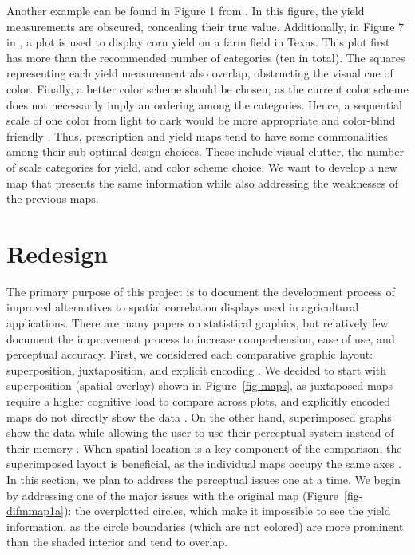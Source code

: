 \documentclass[
  authoryear,
  preprint,
  3p]{elsarticle}
\begin{document}
Another example can be found in Figure 1 from \citet{map_2020}. In this
figure, the yield measurements are obscured, concealing their true
value. Additionally, in Figure 7 in \citet{searcy1997precision}, a plot
is used to display corn yield on a farm field in Texas. This plot first
has more than the recommended number of categories (ten in total). The
squares representing each yield measurement also overlap, obstructing
the visual cue of color. Finally, a better color scheme should be
chosen, as the current color scheme does not necessarily imply an
ordering among the categories. Hence, a sequential scale of one color
from light to dark would be more appropriate and color-blind friendly
\citep{MIDWAY2020100141}. Thus, prescription and yield maps tend to have
some commonalities among their sub-optimal design choices. These include
visual clutter, the number of scale categories for yield, and color
scheme choice. We want to develop a new map that presents the same
information while also addressing the weaknesses of the previous maps.

\hypertarget{redesign}{%
\section{Redesign}\label{redesign}}

The primary purpose of this project is to document the development
process of improved alternatives to spatial correlation displays used in
agricultural applications. There are many papers on statistical
graphics, but relatively few document the improvement process to
increase comprehension, ease of use, and perceptual accuracy. First, we
considered each comparative graphic layout: superposition,
juxtaposition, and explicit encoding \citep{gleicher2011}. We decided to
start with superposition (spatial overlay) shown in
Figure~\ref{fig-maps}, as juxtaposed maps require a higher cognitive
load to compare across plots, and explicitly encoded maps do not
directly show the data \citep{lyi2021}. On the other hand, superimposed
graphs show the data while allowing the user to use their perceptual
system instead of their memory \citep{gleicher2011}. When spatial
location is a key component of the comparison, the superimposed layout
is beneficial, as the individual maps occupy the same axes
\citep{Wood2007InteractiveVE, wang_comp18}. In this section, we plan to
address the perceptual issues one at a time. We begin by addressing one
of the major issues with the original map (Figure~\ref{fig-difmmap1a}):
the overplotted circles, which make it impossible to see the yield
information, as the circle boundaries (which are not colored) are more
prominent than the shaded interior and tend to overlap.
\end{document}
